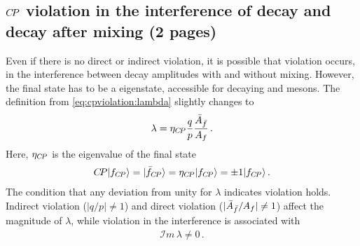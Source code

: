 
\subsection{\texorpdfstring{$\CP$}{CP} violation in the interference of decay and decay after mixing (2 pages)}
\label{sec:cpviolation:types:interference}

Even if there is no direct or indirect \CP violation, it is possible that \CP
violation occurs, in the interference between decay amplitudes with and
without mixing. However, the final state has to be a \CP eigenstate, \ie
accessible for decaying \Bd and \Bdb mesons. The definition from
\cref{eq:cpviolation:lambda} slightly changes to
\begin{align}
  \lambda = \eta_{\CP} \frac qp \frac{\Abarfbar}{\Af}\,.
\end{align}
Here, $\eta_{\CP}$ is the \CP eigenvalue of the final state
\begin{align}
  \CP \ket{f_{\CP}} = \ket{\fbar_{\CP}} = \eta_{\CP} \ket{f_{\CP}} = \num{\pm1} \ket{f_{\CP}}\,.
\end{align}
The condition that any deviation from unity for $\lambda$ indicates \CP
violation holds. Indirect \CP violation ($|q/p| \neq 1$) and direct \CP
violation ($|\Abarfbar/\Af| \neq 1$) affect the magnitude of $\lambda$, while
\CP violation in the interference is associated with
\begin{align}
  \mathcal{I}m\,\lambda \neq 0\,.
\label{eq:cpviolation:imlambda}
\end{align}

